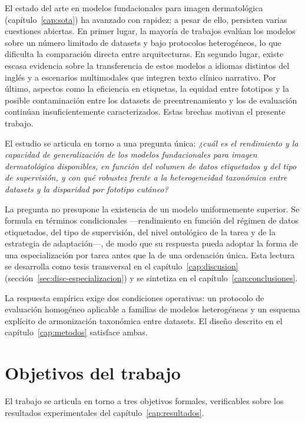 El estado del arte en modelos fundacionales para imagen
dermatológica (capítulo~\ref{cap:sota}) ha avanzado con rapidez; a
pesar de ello, persisten varias cuestiones abiertas. En primer
lugar, la mayoría de trabajos evalúan los modelos sobre un número
limitado de datasets y bajo protocolos heterogéneos, lo que dificulta
la comparación directa entre arquitecturas. En segundo lugar, existe
escasa evidencia sobre la transferencia de estos modelos a idiomas
distintos del inglés y a escenarios multimodales que integren texto
clínico narrativo. Por último, aspectos como la eficiencia en
etiquetas, la equidad entre fototipos y la posible contaminación
entre los datasets de preentrenamiento y los de evaluación continúan
insuficientemente caracterizados. Estas brechas motivan el presente
trabajo.

El estudio se articula en torno a una pregunta única: \emph{¿cuál
es el rendimiento y la capacidad de generalización de los modelos
fundacionales para imagen dermatológica disponibles, en función del
volumen de datos etiquetados y del tipo de supervisión, y con qué
robustez frente a la heterogeneidad taxonómica entre datasets y la
disparidad por fototipo cutáneo?}

La pregunta no presupone la existencia de un modelo uniformemente
superior. Se formula en términos condicionales ---rendimiento en
función del régimen de datos etiquetados, del tipo de supervisión,
del nivel ontológico de la tarea y de la estrategia de
adaptación---, de modo que su respuesta pueda adoptar la forma de
una especialización por tarea antes que la de una ordenación única.
Esta lectura se desarrolla como tesis transversal en el
capítulo~\ref{cap:discusion}
(sección~\ref{sec:disc-especializacion}) y se sintetiza en el
capítulo~\ref{cap:conclusiones}.

La respuesta empírica exige dos condiciones operativas: un
protocolo de evaluación homogéneo aplicable a familias de modelos
heterogéneas y un esquema explícito de armonización taxonómica
entre datasets. El diseño descrito en el
capítulo~\ref{cap:metodos} satisface ambas.


\section{Objetivos del trabajo}
\label{sec:objetivos}

El trabajo se articula en torno a tres objetivos formales,
verificables sobre los resultados experimentales del
capítulo~\ref{cap:resultados}.

